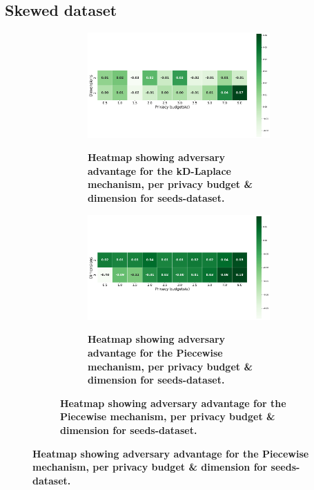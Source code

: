 \subsection{Skewed dataset}
\begin{figure}[H]
  \centering
  \begin{subfigure}[b]{0.85\textwidth}
    \begin{subfigure}[c]{1\textwidth}
      \caption{\textbf{Heatmap showing adversary advantage for the kD-Laplace mechanism, per privacy budget \& dimension for seeds-dataset.}}
      \includegraphics[width=1\textwidth]{Results/nd-laplace/nd-Laplace/skewed-dataset/attack_adv.png}
      \label{fig:privacy_skewed-dataset_adversial_advantage_kd-laplace}
    \end{subfigure}
    \vfill %

    \begin{subfigure}[c]{1\textwidth}
      \caption{\textbf{Heatmap showing adversary advantage for the Piecewise mechanism, per privacy budget \& dimension for seeds-dataset.}}
      \includegraphics[width=1\textwidth]{Results/nd-laplace/piecewise/skewed-dataset/attack_adv.png}
      \label{fig:privacy_skewed-dataset_adversial_advantage_piecewise}
    \end{subfigure}
  \end{subfigure}
\end{figure}
\newpage
